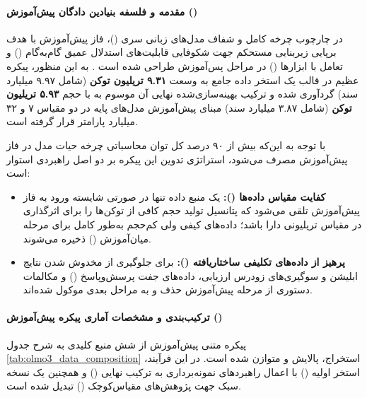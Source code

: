\item {}

\paragraph*{مقدمه و فلسفه بنیادین دادگان پیش‌آموزش ()}
در چارچوب چرخه کامل و شفاف مدل‌های زبانی سری  ()، فاز پیش‌آموزش با هدف برپایی زیربنایی مستحکم جهت شکوفایی قابلیت‌های استدلال عمیق گام‌به‌گام () و تعامل با ابزارها () در مراحل پس‌آموزش طراحی شده است \cite{olmo2024two}. به این منظور، پیکره عظیم \textbf{} در قالب یک استخر داده جامع به وسعت \textbf{۹.۳۱ تریلیون توکن} (شامل ۹.۹۷ میلیارد سند) گردآوری شده و ترکیب بهینه‌سازی‌شده نهایی آن موسوم به \textbf{} با حجم \textbf{۵.۹۳ تریلیون توکن} (شامل ۳.۸۷ میلیارد سند) مبنای پیش‌آموزش مدل‌های پایه در دو مقیاس ۷ و ۳۲ میلیارد پارامتر قرار گرفته است.

با توجه به این‌که بیش از ۹۰ درصد کل توان محاسباتی چرخه حیات مدل در فاز پیش‌آموزش مصرف می‌شود، استراتژی تدوین این پیکره بر دو اصل راهبردی استوار است:
\begin{itemize}
    \item \textbf{کفایت مقیاس داده‌ها ():} یک منبع داده تنها در صورتی شایسته ورود به فاز پیش‌آموزش تلقی می‌شود که پتانسیل تولید حجم کافی از توکن‌ها را برای اثرگذاری در مقیاس تریلیونی دارا باشد؛ داده‌های کیفی ولی کم‌حجم به‌طور کامل برای مرحله میان‌آموزش () ذخیره می‌شوند.
    \item \textbf{پرهیز از داده‌های تکلیفی ساختاریافته ():} برای جلوگیری از مخدوش شدن نتایج ابلیشن و سوگیری‌های زودرس ارزیابی، داده‌های جفت پرسش‌وپاسخ () و مکالمات دستوری از مرحله پیش‌آموزش حذف و به مراحل بعدی موکول شده‌اند.
\end{itemize}

\paragraph*{ترکیب‌بندی و مشخصات آماری پیکره پیش‌آموزش ()}
پیکره متنی پیش‌آموزش  از شش منبع کلیدی به شرح جدول \ref{tab:olmo3_data_composition} استخراج، پالایش و متوازن شده است. در این فرآیند، استخر اولیه () با اعمال راهبردهای نمونه‌برداری به ترکیب نهایی () و همچنین یک نسخه سبک جهت پژوهش‌های مقیاس‌کوچک () تبدیل شده است.

